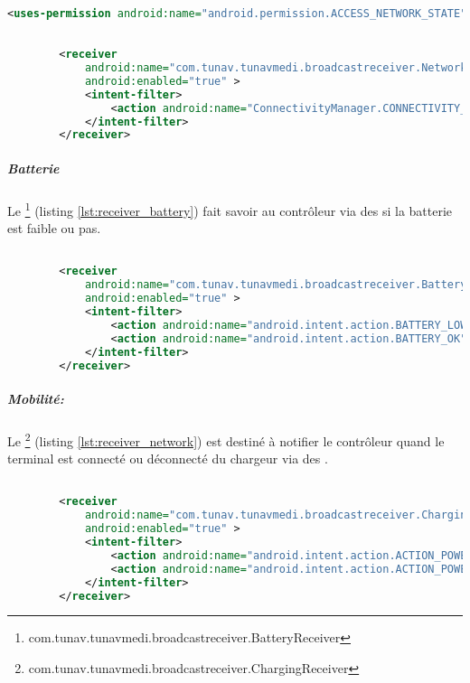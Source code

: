 \begin{lstlisting}[language=xml, label=lst:permission_network, caption=Déclaration dans AndroidManifest des permissions d’accès à l’état des interfaces réseaux.]

<uses-permission android:name="android.permission.ACCESS_NETWORK_STATE" />

\end{lstlisting}

\begin{lstlisting}[language=xml, label=lst:receiver_network, caption=Déclaration dans AndroidManifest du  NetworkReceiver]

        <receiver
            android:name="com.tunav.tunavmedi.broadcastreceiver.NetworkReceiver"
            android:enabled="true" >
            <intent-filter>
                <action android:name="ConnectivityManager.CONNECTIVITY_ACTION" />
            </intent-filter>
        </receiver>

\end{lstlisting}

\subparagraph{Batterie}

Le \footnote{com.tunav.tunavmedi.broadcastreceiver.BatteryReceiver} (listing \ref{lst:receiver_battery}) fait savoir au contrôleur via des  si la batterie est faible ou pas.

\begin{lstlisting}[language=xml, label=lst:receiver_battery, caption=Déclaration dans AndroidManifest du BatteryReceiver.]

        <receiver
            android:name="com.tunav.tunavmedi.broadcastreceiver.BatteryReceiver"
            android:enabled="true" >
            <intent-filter>
                <action android:name="android.intent.action.BATTERY_LOW" />
                <action android:name="android.intent.action.BATTERY_OK" />
            </intent-filter>
        </receiver>

\end{lstlisting}

\subparagraph{Mobilité:}
Le \footnote{com.tunav.tunavmedi.broadcastreceiver.ChargingReceiver} (listing \ref{lst:receiver_network}) est destiné à notifier le contrôleur quand le terminal est connecté ou déconnecté du  chargeur via des .

\begin{lstlisting}[language=xml, label=lst:receiver_charging, caption=Déclaration dans AndroidManifest ChargingReceivers.]

        <receiver
            android:name="com.tunav.tunavmedi.broadcastreceiver.ChargingReceiver"
            android:enabled="true" >
            <intent-filter>
                <action android:name="android.intent.action.ACTION_POWER_CONNECTED" />
                <action android:name="android.intent.action.ACTION_POWER_DISCONNECTED" />
            </intent-filter>
        </receiver>

\end{lstlisting}

